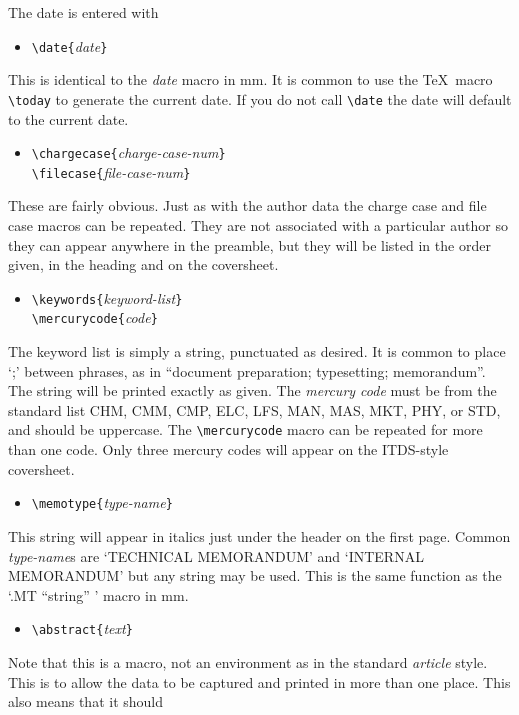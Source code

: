 The date is entered with
\begin{itemize}
\item[]
\verb|\date{|{\it date\/}\verb|}|
\end{itemize}
This is identical to the {\it date} macro in mm.  It is common to
use the \TeX\ macro \verb|\today| to generate the current date.  If
you do not call \verb|\date| the date will default to the current date.
\begin{itemize}
\item[]
\verb|\chargecase{|{\it charge-case-num\/}\verb|}|\\
\verb|\filecase{|{\it file-case-num\/}\verb|}|
\end{itemize}
These are fairly obvious.  Just as with the author data the charge
case and file case macros can be repeated.  They are not associated
with a particular author so they can appear anywhere in the
preamble, but they will be listed in the order given, in the heading
and on the coversheet.
\begin{itemize}
\item[]
\verb|\keywords{|{\it keyword-list\/}\verb|}|\\
\verb|\mercurycode{|{\it code\/}\verb|}|
\end{itemize}
The keyword list is simply a string, punctuated as desired.  It is
common to place `;' between phrases, as in ``document preparation;
typesetting; memorandum''.  The string will be printed exactly as
given.  The {\it mercury code} must be from
the standard list CHM, CMM, CMP, ELC, LFS, MAN, MAS, MKT, PHY, or
STD, and should be uppercase.  
The \verb|\mercurycode| macro can be repeated for more than
one code.  Only three mercury codes will appear on the ITDS-style
coversheet.
\begin{itemize}
\item[]
\verb|\memotype{|{\it type-name\/}\verb|}|
\end{itemize}
This string will appear in italics just under the header on the
first page.  Common {\it type-name}s are `TECHNICAL MEMORANDUM'
and `INTERNAL MEMORANDUM' but any string may be used.  This is the
same function as the `.MT ``string'' ' macro in mm.
\begin{itemize}
\item[]
\verb|\abstract{|{\it text}\verb|}|
\end{itemize}
Note that this is a macro, not an environment as in the standard {\it
article} style.  This is to allow the data to be captured and
printed in more than one place.  This also means that it should
